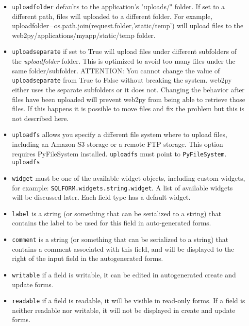 \documentclass[justified,sixbynine,notoc]{tufte-book}
\def\ft{\small\tt}
\def\inxx#1{\index{#1}}
\begin{document}
\begin{fullwidth}
\begin{itemize}
\item {\ft uploadfolder} defaults to the application's "uploads/" folder. If set to a different path, files will uploaded to a different folder. For example, uploadfolder=os.path.join(request.folder,'static/temp') will upload files to the web2py/applications/myapp/static/temp folder.

\item {\ft uploadseparate} if set to True will upload files under different subfolders of the {\it uploadfolder} folder. This is optimized to avoid too many files under the same folder/subfolder. ATTENTION: You cannot change the value of {\ft uploadseparate} from True to False without breaking the system. web2py either uses the separate subfolders or it does not. Changing the behavior after files have been uploaded will prevent web2py from being able to retrieve those files. If this happens it is possible to move files and fix the problem but this is not described here.

\item {\ft uploadfs} allows you specify a different file system where to upload files, including an Amazon S3 storage or a remote FTP storage. This option requires PyFileSystem installed. {\ft uploadfs} must point to {\ft PyFileSystem}. \inxx{PyFileSystem} {\ft uploadfs}

\item {\ft widget} must be one of the available widget objects, including custom widgets, for example: {\ft SQLFORM.widgets.string.widget}. A list of available widgets will be discussed later. Each field type has a default widget.

\item {\ft label} is a string (or something that can be serialized to a string) that contains the label to be used for this field in auto-generated forms.

\item {\ft comment}  is a string (or something that can be serialized to a string) that contains a comment associated with this field, and will be displayed to the right of the input field in the autogenerated forms.

\item {\ft writable} if a field is writable, it can be edited in autogenerated create and update forms.

\item {\ft readable} if a field is readable, it will be visible in read-only forms. If a field is neither readable nor writable, it will not be displayed in create and update forms.


\end{itemize}
\end{fullwidth}
\end{document}
